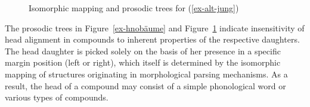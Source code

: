\documentclass[output=paper
 ,nobabel
 ,draftmode
 ,colorlinks, citecolor=brown
]{langscibook}
\begin{document}
\begin{figure}
\begin{subfigure}{.49\textwidth}
\centering
{}
\end{subfigure}%
%
\begin{subfigure}{.49\textwidth}
\centering
{}
\end{subfigure}

\vspace{10pt}
\begin{subfigure}{.49\textwidth}
\centering
{}
\end{subfigure}%
%
\begin{subfigure}{.49\textwidth}
\centering
\scalebox{.95}{%
\begin{forest}%
[COMP-P, s sep=2ex
	[COMP-P\sub{Hd}, s sep=4ex
		[\textbf{(uʀ)\rlapsub{ωHd}}]
		[(alt)\rlapsub{ω}]
	]
	[COPCOMP-P, s sep=2ex
		[(ve)\rlapsub{ω}]
		[(ɡe)\rlapsub{ωHd}]
	]
]
\end{forest}
}
\end{subfigure}
\caption{Isomorphic mapping and prosodic trees for (\ref{ex-alt-jung})}
\label{fig-compbäume}
\end{figure}

\largerpage[-1]
The prosodic trees in Figure~\ref{ex-hnobäume} and Figure~\ref{fig-compbäume} indicate
insensitivity of head alignment in compounds to inherent properties of the respective daughters. The head daughter is picked solely on the basis of her presence in a specific margin position (left or right), which itself is determined by the isomorphic mapping of structures originating in morphological parsing mechanisms. As a result, the head of a compound may consist of a simple phonological word or various types of compounds. 
\end{document}
